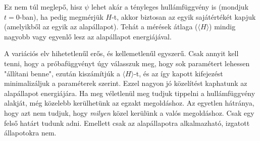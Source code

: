 \documentclass[../main.tex]{subfiles}
\begin{document}
Ez nem túl meglepő, hisz $\psi$ lehet akár a tényleges hullámfüggvény is (mondjuk $t = 0$-ban), ha pedig megmérjük $H$-t, akkor biztosan az egyik sajátértékét kapjuk (amelyikből az egyik az alapállapot).
Tehát a mérések átlaga ($\langle H \rangle$) mindig nagyobb vagy egyenlő lesz az alapállapot energiájával.

A variációs elv hihetetlenűl erős, és kellemetlenűl egyszerű. Csak annyit kell tenni, hogy a próbafüggvényt úgy válasszuk meg, hogy sok paramétert lehessen "állítani benne",
ezután kiszámítjúk a $\langle H \rangle$-t, és az így kapott kifejezést minimalizáljuk a paraméterek szerint. Ezzel nagyon jó közelítést kaphatunk az alapállapot energiájára.
Ha meg véletlenül meg tudjuk tippelni a hullámfüggvény alakját, még közelebb kerülhetünk az egzakt megoldáshoz. Az egyetlen hátránya, hogy azt nem tudjuk, hogy \textit{milyen} közel
kerülünk a valós megoldáshoz. Csak egy felső határt tudunk adni. Emellett csak az alapállapotra alkalmazható, izgatott állapotokra nem.
\end{document}
